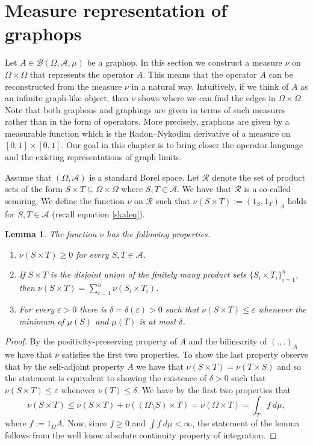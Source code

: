 \documentclass[a4wider]{amsart}
\newtheorem{lemma}[theorem]{Lemma}
\theoremstyle{definitionbreak}\newtheorem{D}[theorem]{Definition}
\theoremstyle{definitionbreak}\newtheorem*{D*}{Definition}
\begin{document}
\section{Measure representation of graphops}

Let $A\in\mathcal{B}(\Omega,\mathcal{A},\mu)$ be a graphop. In this section we construct a measure $\nu$ on $\Omega\times\Omega$ that represents the operator $A$. This means that the operator $A$ can be reconstructed from the measure $\nu$ in a natural way. Intuitively, if we think of $A$ as an infinite graph-like object, then $\nu$ shows where we can find the edges in $\Omega\times\Omega$. Note that both graphons and graphings are given in terms of such measures rather than in the form of operators. More precisely, graphons are given by a measurable function which is the Radon--Nykodim derivative of a measure on $[0,1]\times [0,1]$. Our goal in this chapter is to bring closer the operator language and the existing representations of graph limits. 

Assume that $(\Omega,\mathcal{A})$ is a standard Borel space. Let $\mathcal{R}$ denote the set of product sets of the form $S\times T\subseteq\Omega\times\Omega$ where $S,T\in\mathcal{A}$. We have that $\mathcal{R}$ is a so-called semiring. We define the function $\nu$ on $\mathcal{R}$ such that $\nu(S\times T):=(1_S,1_T)_A$ holds for $S,T\in\mathcal{A}$ (recall equation \eqref{skaleq}). 

\begin{lemma}\label{measreplem} The function $\nu$ has the following properties.
\begin{enumerate}
\item $\nu(S\times T)\geq 0$ for every $S,T\in\mathcal{A}$.
\item If $S\times T$ is the disjoint union of the finitely many product sets $\{S_i\times T_i\}_{i=1}^n$, then $\nu(S\times T)=\sum_{i=1}^n\nu(S_i\times T_i)$. 
\item For every $\varepsilon>0$ there is $\delta=\delta(\varepsilon)>0$ such that $\nu(S\times T)\leq \varepsilon$ whenever the minimum of $\mu(S)$ and $\mu(T)$ is at most $\delta$.
\end{enumerate}
\end{lemma}

\begin{proof} By the positivity-preserving property of $A$ and the bilinearity of $(.,.)_A$ we have that $\nu$ satisfies the first two properties. To show the last property observe that by the self-adjoint property $A$ we have that $\nu(S\times T)=\nu(T\times S)$ and so the statement is equivalent to showing the existence of $\delta>0$ such that  $\nu(S\times T)\leq\varepsilon$ whenever $\nu(T)\leq\delta$. We have by the first two properties that
 $$\nu(S\times T)\leq \nu(S\times T)+\nu((\Omega\setminus S)\times T)=\nu(\Omega\times T)=\int_T f~d\mu,$$ where $f:=1_\Omega A$. Now, since $f\geq 0$ and $\int f~d\mu<\infty$, the statement of the lemma follows from the well know absolute continuity property of integration.
\end{proof}
\end{document}

